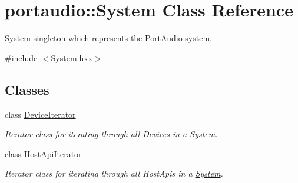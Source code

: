 \hypertarget{classportaudio_1_1_system}{}\section{portaudio\+:\+:System Class Reference}
\label{classportaudio_1_1_system}


\hyperlink{classportaudio_1_1_system}{System} singleton which represents the Port\+Audio system.  




{\ttfamily \#include $<$System.\+hxx$>$}

\subsection*{Classes}
\begin{DoxyCompactItemize}
\item 
class \hyperlink{classportaudio_1_1_system_1_1_device_iterator}{Device\+Iterator}
\begin{DoxyCompactList}\small\item\em Iterator class for iterating through all Devices in a \hyperlink{classportaudio_1_1_system}{System}. \end{DoxyCompactList}\item 
class \hyperlink{classportaudio_1_1_system_1_1_host_api_iterator}{Host\+Api\+Iterator}
\begin{DoxyCompactList}\small\item\em Iterator class for iterating through all Host\+Apis in a \hyperlink{classportaudio_1_1_system}{System}. \end{DoxyCompactList}\end{DoxyCompactItemize}

